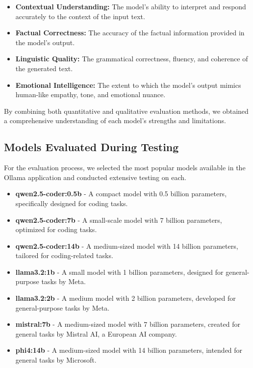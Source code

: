 \begin{itemize}
    \item \textbf{Contextual Understanding:} The model's ability to interpret and respond accurately to the context of the input text.
    \item \textbf{Factual Correctness:} The accuracy of the factual information provided in the model's output.
    \item \textbf{Linguistic Quality:} The grammatical correctness, fluency, and coherence of the generated text.
    \item \textbf{Emotional Intelligence:} The extent to which the model's output mimics human-like empathy, tone, and emotional nuance.
\end{itemize}

By combining both quantitative and qualitative evaluation methods, 
we obtained a comprehensive understanding of each model's strengths and limitations.


\subsection{Models Evaluated During Testing}

For the evaluation process, we selected the most popular models available in the Ollama application and conducted extensive testing on each.

\begin{itemize}
    \item \textbf{qwen2.5-coder:0.5b} - A compact model with 0.5 billion parameters, specifically designed for coding tasks.
    \item \textbf{qwen2.5-coder:7b} - A small-scale model with 7 billion parameters, optimized for coding tasks.
    \item \textbf{qwen2.5-coder:14b} - A medium-sized model with 14 billion parameters, tailored for coding-related tasks.
    \item \textbf{llama3.2:1b} - A small model with 1 billion parameters, designed for general-purpose tasks by Meta.
    \item \textbf{llama3.2:2b} - A medium model with 2 billion parameters, developed for general-purpose tasks by Meta.
    \item \textbf{mistral:7b} - A medium-sized model with 7 billion parameters, created for general tasks by Mistral AI, a European AI company.
    \item \textbf{phi4:14b} - A medium-sized model with 14 billion parameters, intended for general tasks by Microsoft.
\end{itemize}

